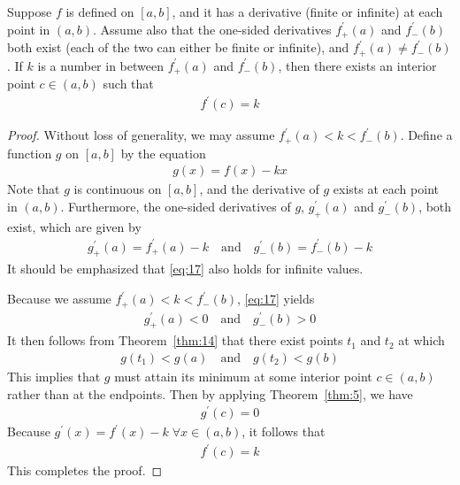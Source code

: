\documentclass[thmcnt=section, 12pt]{my-elegantbook}
\begin{document}
\begin{theorem} \label{thm:13}
    Suppose $f$ is defined on $[a, b]$, and it has a derivative (finite or infinite) at each point in $(a, b)$. Assume also that the one-sided derivatives $f^\prime_{+}(a)$ and $f^\prime_{-}(b)$ both exist (each of the two can either be finite or infinite), and $f^\prime_{+}(a) \neq f^\prime_{-}(b)$. If $k$ is a number in between $f^\prime_{+}(a)$ and $f^\prime_{-}(b)$, then there exists an interior point $c \in (a, b)$ such that 
    \begin{align*}
        f^\prime(c) = k
    \end{align*}
\end{theorem}

\begin{proof}
    Without loss of generality, we may assume $f^\prime_{+}(a) < k <  f^\prime_{-}(b)$. Define a function $g$ on $[a, b]$ by the equation
    \begin{align*}
        g(x) = f(x) - kx
    \end{align*}
    Note that $g$ is continuous on $[a, b]$, and the derivative of $g$ exists at each point in $(a, b)$. Furthermore, the one-sided derivatives of $g$, $g^\prime_{+}(a)$ and $g^\prime_{-}(b)$, both exist, which are given by
    \begin{align}
        g^\prime_{+}(a) = f^\prime_{+}(a) - k
        \quad \text{and} \quad 
        g^\prime_{-}(b) = f^\prime_{-}(b) - k
        \label{eq:17}
    \end{align} 
    It should be emphasized that \eqref{eq:17} also holds for infinite values. 

    \par Because we assume $f^\prime_{+}(a) < k <  f^\prime_{-}(b)$, \eqref{eq:17} yields
    \begin{align*}
        g^\prime_{+}(a) < 0
        \quad \text{and} \quad 
        g^\prime_{-}(b) > 0
    \end{align*} 
    It then follows from Theorem~\ref{thm:14} that there exist points $t_1$ and $t_2$ at which
    \begin{align*}
        g(t_1) < g(a)
        \quad \text{and} \quad 
        g(t_2) < g(b)
    \end{align*}
    This implies that $g$ must attain its minimum at some interior point $c \in (a, b)$ rather than at the endpoints. Then by applying Theorem~\ref{thm:5}, we have 
    \begin{align*}
        g^\prime(c) = 0
    \end{align*}
    Because $g^\prime(x) = f^\prime(x) - k \; \forall x \in (a, b)$, it follows that
    \begin{align*}
        f^\prime(c) = k
    \end{align*}
    This completes the proof.
\end{proof}
\end{document}
